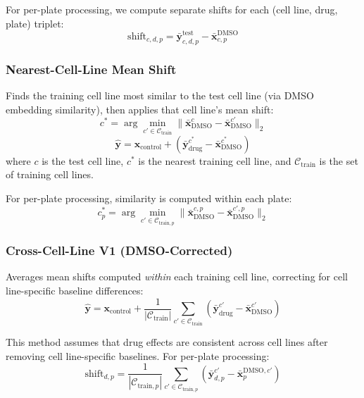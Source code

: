 \documentclass[conference]{IEEEtran}
\begin{document}
For per-plate processing, we compute separate shifts for each (cell line, drug, plate) triplet:
\begin{equation}
\text{shift}_{c,d,p} = \bar{\mathbf{y}}_{c,d,p}^{\text{test}} - \bar{\mathbf{x}}_{c,p}^{\text{DMSO}}
\end{equation}

\subsubsection{Nearest-Cell-Line Mean Shift}

Finds the training cell line most similar to the test cell line (via DMSO embedding similarity), then applies that cell line's mean shift:
\begin{equation}
c^* = \arg\min_{c' \in \mathcal{C}_{\text{train}}} \|\bar{\mathbf{x}}_{\text{DMSO}}^{c} - \bar{\mathbf{x}}_{\text{DMSO}}^{c'}\|_2
\end{equation}
\begin{equation}
\hat{\mathbf{y}} = \mathbf{x}_{\text{control}} + (\bar{\mathbf{y}}_{\text{drug}}^{c^*} - \bar{\mathbf{x}}_{\text{DMSO}}^{c^*})
\end{equation}
where $c$ is the test cell line, $c^*$ is the nearest training cell line, and $\mathcal{C}_{\text{train}}$ is the set of training cell lines.

For per-plate processing, similarity is computed within each plate:
\begin{equation}
c^*_p = \arg\min_{c' \in \mathcal{C}_{\text{train},p}} \|\bar{\mathbf{x}}_{\text{DMSO}}^{c,p} - \bar{\mathbf{x}}_{\text{DMSO}}^{c',p}\|_2
\end{equation}

\subsubsection{Cross-Cell-Line V1 (DMSO-Corrected)}

Averages mean shifts computed \textit{within} each training cell line, correcting for cell line-specific baseline differences:
\begin{equation}
\hat{\mathbf{y}} = \mathbf{x}_{\text{control}} + \frac{1}{|\mathcal{C}_{\text{train}}|} \sum_{c' \in \mathcal{C}_{\text{train}}} (\bar{\mathbf{y}}_{\text{drug}}^{c'} - \bar{\mathbf{x}}_{\text{DMSO}}^{c'})
\end{equation}

This method assumes that drug effects are consistent across cell lines after removing cell line-specific baselines. For per-plate processing:
\begin{equation}
\text{shift}_{d,p} = \frac{1}{|\mathcal{C}_{\text{train},p}|} \sum_{c' \in \mathcal{C}_{\text{train},p}} (\bar{\mathbf{y}}_{d,p}^{c'} - \bar{\mathbf{x}}_{p}^{\text{DMSO},c'})
\end{equation}
\end{document}
